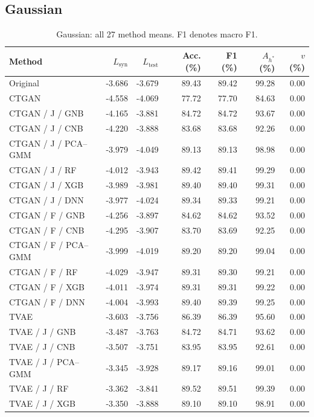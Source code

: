 \documentclass[11pt,letterpaper]{article}
\newcommand{\Lsyn}{L_{\mathrm{syn}}}
\newcommand{\Ltest}{L_{\mathrm{test}}}
\begin{document}
\subsection{Gaussian}
\begin{table}[H]\centering
\caption{Gaussian: all 27 method means. F1 denotes macro F1.}\label{tab:all-gaussian}
\small
\begin{tabular}{lrrrrrr}\toprule
Method & $\Lsyn$ & $\Ltest$ & Acc. (\%) & F1 (\%) & $A_{h^*}$ (\%) & $v$ (\%)\\\midrule
Original & -3.686 & -3.679 & 89.43 & 89.42 & 99.28 & 0.00\\
CTGAN & -4.558 & -4.069 & 77.72 & 77.70 & 84.63 & 0.00\\
CTGAN / J / GNB & -4.165 & -3.881 & 84.72 & 84.72 & 93.67 & 0.00\\
CTGAN / J / CNB & -4.220 & -3.888 & 83.68 & 83.68 & 92.26 & 0.00\\
CTGAN / J / PCA--GMM & -3.979 & -4.049 & 89.13 & 89.13 & 98.98 & 0.00\\
CTGAN / J / RF & -4.012 & -3.943 & 89.42 & 89.41 & 99.29 & 0.00\\
CTGAN / J / XGB & -3.989 & -3.981 & 89.40 & 89.40 & 99.31 & 0.00\\
CTGAN / J / DNN & -3.977 & -4.024 & 89.34 & 89.33 & 99.21 & 0.00\\
CTGAN / F / GNB & -4.256 & -3.897 & 84.62 & 84.62 & 93.52 & 0.00\\
CTGAN / F / CNB & -4.295 & -3.907 & 83.70 & 83.69 & 92.25 & 0.00\\
CTGAN / F / PCA--GMM & -3.999 & -4.019 & 89.20 & 89.20 & 99.04 & 0.00\\
CTGAN / F / RF & -4.029 & -3.947 & 89.31 & 89.30 & 99.21 & 0.00\\
CTGAN / F / XGB & -4.011 & -3.974 & 89.31 & 89.31 & 99.22 & 0.00\\
CTGAN / F / DNN & -4.004 & -3.993 & 89.40 & 89.39 & 99.25 & 0.00\\
TVAE & -3.603 & -3.756 & 86.39 & 86.39 & 95.60 & 0.00\\
TVAE / J / GNB & -3.487 & -3.763 & 84.72 & 84.71 & 93.62 & 0.00\\
TVAE / J / CNB & -3.507 & -3.751 & 83.95 & 83.95 & 92.61 & 0.00\\
TVAE / J / PCA--GMM & -3.345 & -3.928 & 89.17 & 89.16 & 99.01 & 0.00\\
TVAE / J / RF & -3.362 & -3.841 & 89.52 & 89.51 & 99.39 & 0.00\\
TVAE / J / XGB & -3.350 & -3.888 & 89.10 & 89.10 & 98.91 & 0.00\\

\end{tabular}
\end{table}
\end{document}
